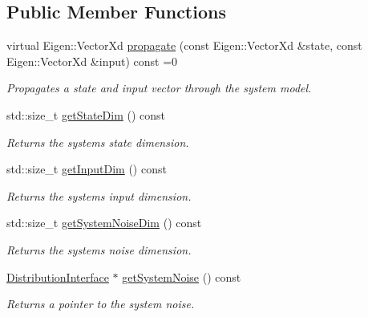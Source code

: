 \subsection*{Public Member Functions}
\begin{DoxyCompactItemize}
\item 
virtual Eigen\+::\+Vector\+Xd \hyperlink{classrefill_1_1SystemModelBase_a92d2c65291b3086f810e362cf4194eb0}{propagate} (const Eigen\+::\+Vector\+Xd \&state, const Eigen\+::\+Vector\+Xd \&input) const =0
\begin{DoxyCompactList}\small\item\em Propagates a state and input vector through the system model. \end{DoxyCompactList}\item 
std\+::size\+\_\+t \hyperlink{classrefill_1_1SystemModelBase_a56128ef3ffd3a0f4fb5ebaa543b5f719}{get\+State\+Dim} () const 
\begin{DoxyCompactList}\small\item\em Returns the systems state dimension. \end{DoxyCompactList}\item 
std\+::size\+\_\+t \hyperlink{classrefill_1_1SystemModelBase_ada4237797b93bf1da249edd2c4ec91a2}{get\+Input\+Dim} () const 
\begin{DoxyCompactList}\small\item\em Returns the systems input dimension. \end{DoxyCompactList}\item 
std\+::size\+\_\+t \hyperlink{classrefill_1_1SystemModelBase_aef4177aef8fba2c5a7c0c749c88d1c66}{get\+System\+Noise\+Dim} () const 
\begin{DoxyCompactList}\small\item\em Returns the systems noise dimension. \end{DoxyCompactList}\item 
\hyperlink{classrefill_1_1DistributionInterface}{Distribution\+Interface} $\ast$ \hyperlink{classrefill_1_1SystemModelBase_a2f733310da14248ab7f5a41840eb88b7}{get\+System\+Noise} () const 
\begin{DoxyCompactList}\small\item\em Returns a pointer to the system noise. \end{DoxyCompactList}\end{DoxyCompactItemize}
